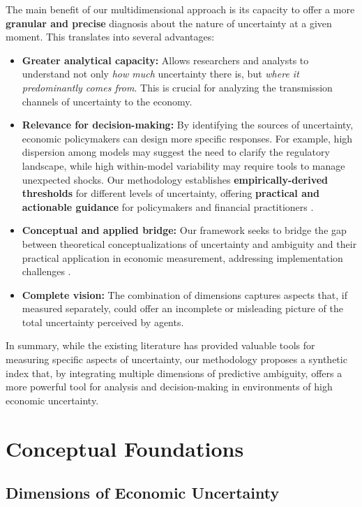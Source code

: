 \documentclass[5p,authoryear]{elsarticle}
\begin{document}
The main benefit of our multidimensional approach is its capacity to offer a more \textbf{granular and precise} diagnosis about the nature of uncertainty at a given moment. This translates into several advantages:
\begin{itemize}
    \item \textbf{Greater analytical capacity:} Allows researchers and analysts to understand not only \emph{how much} uncertainty there is, but \emph{where it predominantly comes from}. This is crucial for analyzing the transmission channels of uncertainty to the economy.
    \item \textbf{Relevance for decision-making:} By identifying the sources of uncertainty, economic policymakers can design more specific responses. For example, high dispersion among models may suggest the need to clarify the regulatory landscape, while high within-model variability may require tools to manage unexpected shocks. Our methodology establishes \textbf{empirically-derived thresholds} for different levels of uncertainty, offering \textbf{practical and actionable guidance} for policymakers and financial practitioners \cite{risk_analysis}.
    \item \textbf{Conceptual and applied bridge:} Our framework seeks to bridge the gap between theoretical conceptualizations of uncertainty and ambiguity and their practical application in economic measurement, addressing implementation challenges \cite{risk_analysis}.
    \item \textbf{Complete vision:} The combination of dimensions captures aspects that, if measured separately, could offer an incomplete or misleading picture of the total uncertainty perceived by agents.
\end{itemize}

In summary, while the existing literature has provided valuable tools for measuring specific aspects of uncertainty, our methodology proposes a synthetic index that, by integrating multiple dimensions of predictive ambiguity, offers a more powerful tool for analysis and decision-making in environments of high economic uncertainty.

\section{Conceptual Foundations}

\subsection{Dimensions of Economic Uncertainty}
\end{document}
